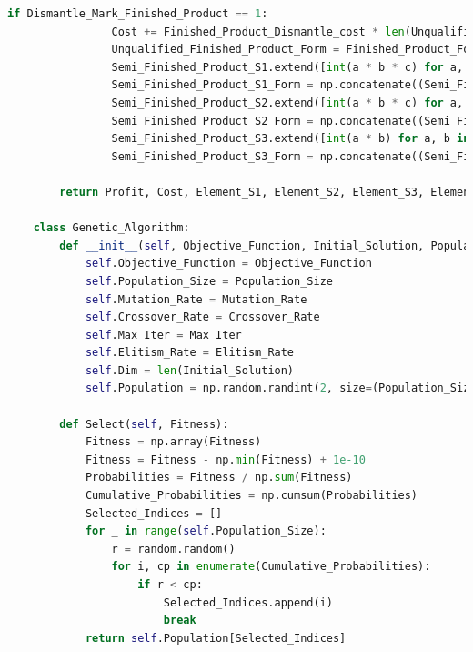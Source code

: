 \documentclass[withoutpreface,bwprint]{cumcmthesis} %
\begin{document}
\begin{appendices}
\begin{lstlisting}[language=python]
			if Dismantle_Mark_Finished_Product == 1:
				Cost += Finished_Product_Dismantle_cost * len(Unqualified_Finished_Product_Indices)
				Unqualified_Finished_Product_Form = Finished_Product_Form[:, Unqualified_Finished_Product_Indices]
				Semi_Finished_Product_S1.extend([int(a * b * c) for a, b, c in zip(Unqualified_Finished_Product_Form[0], Unqualified_Finished_Product_Form[1], Unqualified_Finished_Product_Form[2])])
				Semi_Finished_Product_S1_Form = np.concatenate((Semi_Finished_Product_S1_Form, np.array([Unqualified_Finished_Product_Form[0].tolist(), Unqualified_Finished_Product_Form[1].tolist(), Unqualified_Finished_Product_Form[2].tolist()])), axis=1)
				Semi_Finished_Product_S2.extend([int(a * b * c) for a, b, c in zip(Unqualified_Finished_Product_Form[3], Unqualified_Finished_Product_Form[4], Unqualified_Finished_Product_Form[5])])
				Semi_Finished_Product_S2_Form = np.concatenate((Semi_Finished_Product_S2_Form, np.array([Unqualified_Finished_Product_Form[3].tolist(), Unqualified_Finished_Product_Form[4].tolist(), Unqualified_Finished_Product_Form[5].tolist()])), axis=1)
				Semi_Finished_Product_S3.extend([int(a * b) for a, b in zip(Unqualified_Finished_Product_Form[6], Unqualified_Finished_Product_Form[7])])
				Semi_Finished_Product_S3_Form = np.concatenate((Semi_Finished_Product_S3_Form, np.array([Unqualified_Finished_Product_Form[6].tolist(), Unqualified_Finished_Product_Form[7].tolist()])), axis=1)
	
		return Profit, Cost, Element_S1, Element_S2, Element_S3, Element_S4, Element_S5, Element_S6, Element_S7, Element_S8, Semi_Finished_Product_S1, Semi_Finished_Product_S2, Semi_Finished_Product_S3, Semi_Finished_Product_S1_Form, Semi_Finished_Product_S2_Form, Semi_Finished_Product_S3_Form, Exchange_Quantity
	
	class Genetic_Algorithm:
		def __init__(self, Objective_Function, Initial_Solution, Population_Size=100, Mutation_Rate=0.1, Crossover_Rate=0.5, Max_Iter=100, Elitism_Rate=0.05):
			self.Objective_Function = Objective_Function
			self.Population_Size = Population_Size
			self.Mutation_Rate = Mutation_Rate
			self.Crossover_Rate = Crossover_Rate
			self.Max_Iter = Max_Iter
			self.Elitism_Rate = Elitism_Rate
			self.Dim = len(Initial_Solution)
			self.Population = np.random.randint(2, size=(Population_Size, self.Dim))
	
		def Select(self, Fitness):
			Fitness = np.array(Fitness)
			Fitness = Fitness - np.min(Fitness) + 1e-10
			Probabilities = Fitness / np.sum(Fitness)
			Cumulative_Probabilities = np.cumsum(Probabilities)
			Selected_Indices = []
			for _ in range(self.Population_Size):
				r = random.random()
				for i, cp in enumerate(Cumulative_Probabilities):
					if r < cp:
						Selected_Indices.append(i)
						break
			return self.Population[Selected_Indices]
	

\end{lstlisting}
\end{appendices}
\end{document}
